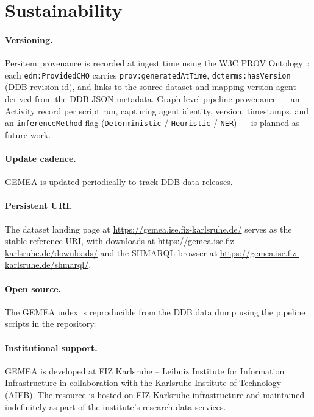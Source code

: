 
\section{Sustainability}
\label{sec:sustainability}

\paragraph{Versioning.}
Per-item provenance is recorded at ingest time using the W3C PROV Ontology~\cite{lebo2013provo}: each \texttt{edm:ProvidedCHO} carries \texttt{prov:generatedAtTime}, \texttt{dcterms:hasVersion} (DDB revision id), and links to the source dataset and mapping-version agent derived from the DDB JSON metadata.
Graph-level pipeline provenance --- an Activity record per script run, capturing agent identity, version, timestamps, and an \texttt{inferenceMethod} flag (\texttt{Deterministic} / \texttt{Heuristic} / \texttt{NER}) --- is planned as future work.

\paragraph{Update cadence.}
GEMEA is updated periodically to track DDB data releases.

\paragraph{Persistent URI.}
The dataset landing page at \url{https://gemea.ise.fiz-karlsruhe.de/} serves as the stable reference URI, with downloads at \url{https://gemea.ise.fiz-karlsruhe.de/downloads/} and the SHMARQL browser at \url{https://gemea.ise.fiz-karlsruhe.de/shmarql/}.

\paragraph{Open source.}
The GEMEA index is reproducible from the DDB data dump using the pipeline scripts in the repository.

\paragraph{Institutional support.}
GEMEA is developed at FIZ Karlsruhe -- Leibniz Institute for Information Infrastructure in collaboration with the Karlsruhe Institute of Technology (AIFB).
The resource is hosted on FIZ Karlsruhe infrastructure and maintained indefinitely as part of the institute's research data services.


